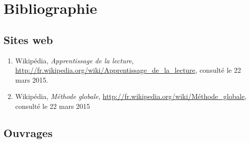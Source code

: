 \section*{Bibliographie}

\subsection*{Sites web}
\begin{enumerate}
\item Wikipédia, \textit{Apprentissage de la lecture}, \url{http://fr.wikipedia.org/wiki/Apprentissage_de_la_lecture}, consulté le 22 mars 2015.
\item Wikipédia, \textit{Méthode globale}, \url{http://fr.wikipedia.org/wiki/Méthode_globale}, consulté le 22 mars 2015
\end{enumerate}

\subsection{Ouvrages}